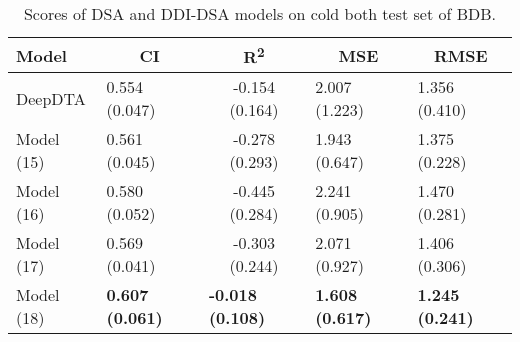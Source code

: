 \begin{table}
\centering
\caption{Scores of DSA and DDI-DSA models on cold both test set of BDB.}
\vspace{0.25em}
\begin{tabular}{|l|l|c|l|l|} 
\hline
Model & \multicolumn{1}{c|}{CI} & R\textsuperscript{2} & \multicolumn{1}{c|}{MSE} & \multicolumn{1}{c|}{RMSE} \\ 
\hline
DeepDTA & 0.554 (0.047) & -0.154 (0.164) & 2.007 (1.223) & 1.356 (0.410) \\ 
\hline
Model (15) & 0.561 (0.045) & -0.278 (0.293) & 1.943 (0.647) & 1.375 (0.228) \\ 
\hline
Model (16) & 0.580 (0.052) & -0.445 (0.284) & 2.241 (0.905) & 1.470 (0.281) \\ 
\hline
Model (17) & 0.569 (0.041) & -0.303 (0.244) & 2.071 (0.927) & 1.406 (0.306) \\ 
\hline
Model (18) & \textbf{0.607 (0.061)} & \multicolumn{1}{l|}{\textbf{-0.018 (0.108)}} & \textbf{1.608 (0.617)} & \textbf{1.245 (0.241)} \\
\hline
\end{tabular}
\label{tab:side_cold}
\end{table}